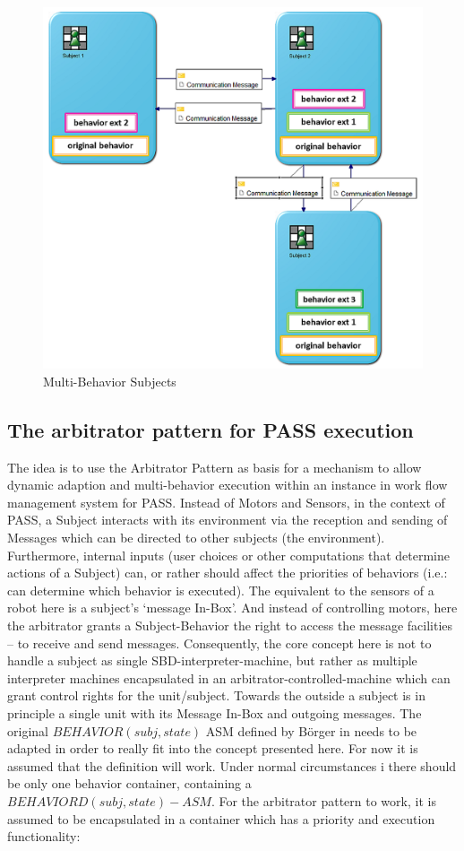 \begin{figure}[htbp]
	\centering
	\includegraphics[width=0.8\linewidth]{Figures/Chapter5/ArbitratorPattern/ArbitratorMultiBehaviorSubjects.png}
	\caption[Multi-Behavior Subjects]{Multi-Behavior Subjects}
	\label{fig:multiBehaviorSubject}
\end{figure}


\subsection{The arbitrator pattern for PASS execution}

The idea is to use the Arbitrator Pattern as basis for a mechanism to allow dynamic adaption and multi-behavior execution within an instance in work flow management system for PASS.  Instead of Motors and Sensors, in the context of PASS, a Subject interacts with its environment  via the reception and sending of Messages which can be directed to other subjects (the environment). Furthermore, internal inputs (user choices or other computations that determine actions of a Subject) can, or rather should affect the priorities of behaviors (i.e.: can determine which behavior is executed).
The equivalent to the sensors of a robot here is a subject’s ‘message In-Box’. And instead of controlling motors, here the arbitrator grants a Subject-Behavior the right to access the message facilities – to receive and send messages. 
Consequently, the core concept here is not to handle a subject as single SBD-interpreter-machine, but rather as multiple interpreter machines encapsulated in an arbitrator-controlled-machine which can grant control rights for the unit/subject. Towards the outside a subject is in principle a single unit with its Message In-Box and outgoing messages. The original $BEHAVIOR(subj,state)$ ASM defined by Börger in \cite{boerger2011interpreter} needs to be adapted in order to really fit into the concept presented here. For now it is assumed that the definition will work. Under normal circumstances i there should be only one behavior container, containing a $BEHAVIORD(subj, state)-ASM$. For the arbitrator pattern to work, it is assumed to be encapsulated in a container which has a priority and execution functionality: 

